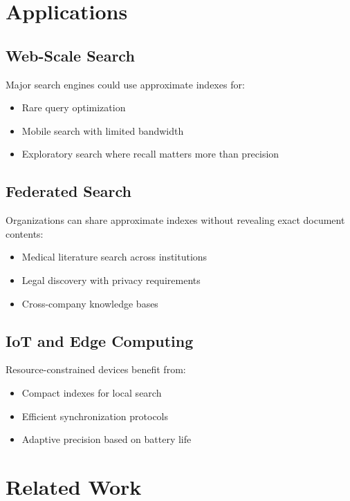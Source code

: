 \documentclass[11pt,final,hidelinks]{article}
\begin{document}
\section{Applications}

\subsection{Web-Scale Search}

Major search engines could use approximate indexes for:
\begin{itemize}
    \item Rare query optimization
    \item Mobile search with limited bandwidth
    \item Exploratory search where recall matters more than precision
\end{itemize}

\subsection{Federated Search}

Organizations can share approximate indexes without revealing exact document contents:
\begin{itemize}
    \item Medical literature search across institutions
    \item Legal discovery with privacy requirements
    \item Cross-company knowledge bases
\end{itemize}

\subsection{IoT and Edge Computing}

Resource-constrained devices benefit from:
\begin{itemize}
    \item Compact indexes for local search
    \item Efficient synchronization protocols
    \item Adaptive precision based on battery life
\end{itemize}

\section{Related Work}
\end{document}
